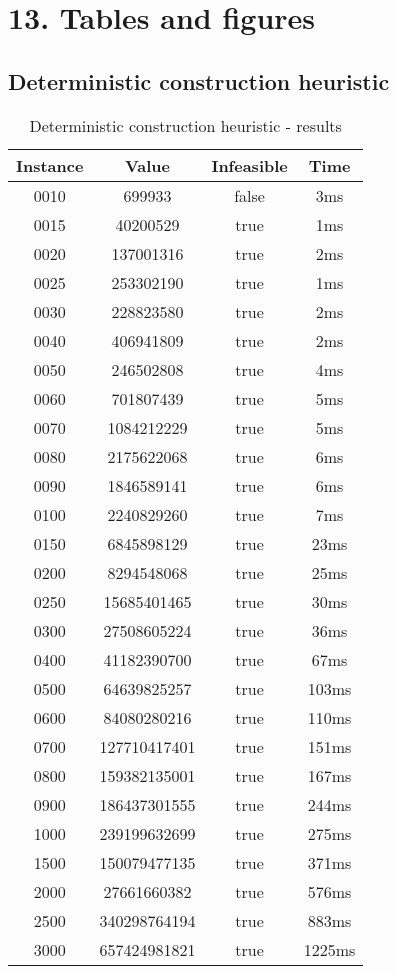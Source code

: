 \section*{13. Tables and figures}
\subsection*{Deterministic construction heuristic}
\begin{table}[H]
	\centering
	\begin{tabular}{||c | c | c | c||} 
		\hline
		Instance  & Value & Infeasible & Time \\
		\hline\hline
		0010 & 699933 & false & 3ms \\
		0015 & 40200529 & true & 1ms \\
		0020 & 137001316 & true & 2ms \\
		0025 & 253302190 & true & 1ms \\
		0030 & 228823580 & true & 2ms \\
		0040 & 406941809 & true & 2ms \\
		0050 & 246502808 & true & 4ms \\
		0060 & 701807439 & true & 5ms \\
		0070 & 1084212229 & true & 5ms \\
		0080 & 2175622068 & true & 6ms \\
		0090 & 1846589141 & true & 6ms \\
		0100 & 2240829260 & true & 7ms \\
		0150 & 6845898129 & true & 23ms \\
		0200 & 8294548068 & true & 25ms \\
		0250 & 15685401465 & true & 30ms \\
		0300 & 27508605224 & true & 36ms \\
		0400 & 41182390700 & true & 67ms \\
		0500 & 64639825257 & true & 103ms \\
		0600 & 84080280216 & true & 110ms \\
		0700 & 127710417401 & true & 151ms \\
		0800 & 159382135001 & true & 167ms \\
		0900 & 186437301555 & true & 244ms \\
		1000 & 239199632699 & true & 275ms \\
		1500 & 150079477135 & true & 371ms \\
		2000 & 27661660382 & true & 576ms \\
		2500 & 340298764194 & true & 883ms \\
		3000 & 657424981821 & true & 1225ms \\
		\hline
	\end{tabular}
	\caption{Deterministic construction heuristic - results}
\end{table}
